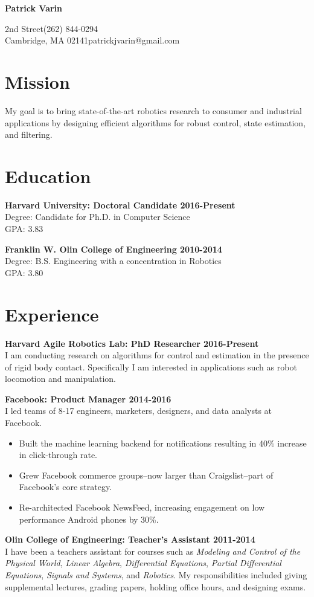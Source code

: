 \documentclass{article}
\newcommand{\name}[1]{\begin{center}\huge\textbf{#1}\end{center}\vspace{1em}}
\newcommand{\personal}[4]{
	\noindent#1\hfill#3\\
	#2\hfill#4
}
\newcommand{\newitem}[2]{\noindent\textbf{#1 \hfill #2}\\}
\newcommand{\gimmespace}{\vspace{1em}}
\begin{document}
\name{Patrick Varin}
\personal{38 2nd Street}{Cambridge, MA 02141}{(262) 844-0294}{patrickjvarin@gmail.com}
\section*{Mission}
\noindent My goal is to bring state-of-the-art robotics research to consumer and industrial applications by designing efficient algorithms for robust control, state estimation, and filtering.

\section*{Education}
\newitem{Harvard University: Doctoral Candidate}{2016-Present}
Degree: Candidate for Ph.D. in Computer Science\\
GPA: 3.83
\gimmespace

\newitem{Franklin W. Olin College of Engineering}{2010-2014}
Degree: B.S. Engineering with a concentration in Robotics\\
GPA: 3.80

\section*{Experience}

\newitem{Harvard Agile Robotics Lab: PhD Researcher}{2016-Present}
I am conducting research on algorithms for control and estimation in the presence of rigid body contact. Specifically I am interested in applications such as robot locomotion and manipulation.
\gimmespace

\newitem{Facebook: Product Manager}{2014-2016}
I led teams of 8-17 engineers, marketers, designers, and data analysts at Facebook.
\begin{itemize}
\item Built the machine learning backend for notifications resulting in 40\% increase in click-through rate.
\item Grew Facebook commerce groups--now larger than Craigslist--part of Facebook's core strategy.
\item Re-architected Facebook NewsFeed, increasing engagement on low performance Android phones by 30\%.
\end{itemize}
\gimmespace

\newitem{Olin College of Engineering: Teacher's Assistant}{2011-2014}
I have been a teachers assistant for courses such as \emph{Modeling and Control of the Physical World}, \emph{Linear Algebra}, \emph{Differential Equations}, \emph{Partial Differential Equations}, \emph{Signals and Systems}, and \emph{Robotics}. My responsibilities included giving supplemental lectures, grading papers, holding office hours, and designing exams.
\gimmespace
\end{document}
